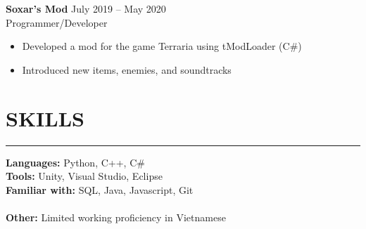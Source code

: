 \documentclass{article}
\begin{document}
\vspace{-6pt}
\textbf{Soxar's Mod} \hfill July 2019 -- May 2020\\
Programmer/Developer
\begin{itemize}
	\item\vspace{-6pt} Developed a mod for the game Terraria using tModLoader (C$\#$)
	\item\vspace{-6pt} Introduced new items, enemies, and soundtracks
\end{itemize}
\vspace{-20pt}

\section*{SKILLS} \vspace{-6pt} \hrule \vspace{6pt}
\textbf{Languages:} Python, C++, C$\#$ \\
\textbf{Tools:} Unity, Visual Studio, Eclipse\\
\textbf{Familiar with:} SQL, Java, Javascript, Git \\\vspace{-6pt}\\
\textbf{Other:} Limited working proficiency in Vietnamese
\end{document}
